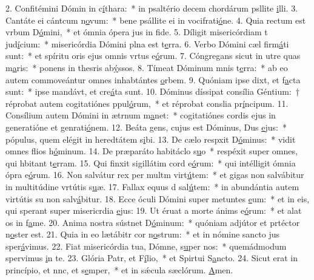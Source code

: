 2. Confitémini Dómin in c\uline{í}thara:~* in psaltério decem chordárum psllite \uline{i}lli.
3. Cantáte ei cántcum n\uline{o}vum:~* bene psállite ei in vocifrati\uline{ó}ne.
4. Quia rectum est vrbum D\uline{ó}mini,~* et ómnia ópera jus in f\uline{i}de.
5. Díligit misericórdiam t jud\uline{í}cium:~* misericórdia Dómini plna est t\uline{e}rra.
6. Verbo Dómini cæl firm\uline{á}ti sunt:~* et spíritu oris ejus omnis vrtus e\uline{ó}rum.
7. Cóngregans sicut in utre quas m\uline{a}ris:~* ponens in thesris ab\uline{ý}ssos.
8. Tímeat Dóminum mnis t\uline{e}rra:~* ab eo autem commoveántur omnes inhabtántes \uline{o}rbem.
9. Quóniam ipse dixt, et f\uline{a}cta sunt:~* ipse mandávt, et cre\uline{á}ta sunt.
10. Dóminus díssipat consília Géntium:~† réprobat autem cogitatiónes ppul\uline{ó}rum,~* et réprobat conslia pr\uline{í}ncipum.
11. Consílium autem Dómini in ætrnum m\uline{a}net:~* cogitatiónes cordis ejus in generatióne et genrati\uline{ó}nem.
12. Beáta gens, cujus est Dóminus, Dus \uline{e}jus:~* pópulus, quem elégit in heredtátem s\uline{i}bi.
13. De cælo respxit D\uline{ó}minus:~* vidit omnes flios h\uline{ó}minum.
14. De præparáto habitáclo s\uline{u}o~* respéxit super omnes, qui hbitant t\uline{e}rram.
15. Qui finxit sigillátim cord e\uline{ó}rum:~* qui intélligit ómnia ópra e\uline{ó}rum.
16. Non salvátur rex per multm virt\uline{ú}tem:~* et gigas non salvábitur in multitúdine vrtútis s\uline{u}æ.
17. Fallax equus d sal\uline{ú}tem:~* in abundántia autem virtútis su non salv\uline{á}bitur.
18. Ecce óculi Dómini super metuntes \uline{e}um:~* et in eis, qui sperant super misericrdia \uline{e}jus:
19. Ut éruat a morte ánims e\uline{ó}rum:~* et alat os in f\uline{a}me.
20. Anima nostra sústnet D\uline{ó}minum:~* quóniam adjútor et prtéctor n\uline{o}ster est.
21. Quia in eo lætábitr cor n\uline{o}strum:~* et in nómine sancto jus sper\uline{á}vimus.
22. Fiat misericórdia tua, Dómne, s\uline{u}per nos:~* quemádmodum spervimus \uline{i}n te.
23. Glória Patr, et F\uline{í}lio,~* et Spirtui S\uline{a}ncto.
24. Sicut erat in princípio, et nnc, et s\uline{e}mper,~* et in sǽcula sæclórum. \uline{A}men.
